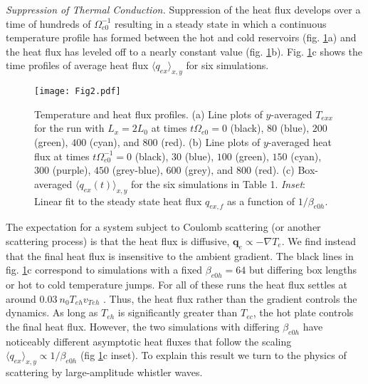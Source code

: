 \documentclass[%
 reprint,
superscriptaddress,
 amsmath,amssymb,
 aps,
]{revtex4-1}
\begin{document}
\textit{Suppression of Thermal Conduction.}  Suppression of the heat flux
develops over a time of hundreds of $\Omega_{e0}^{-1}$ resulting in a
steady state in which a continuous temperature profile has formed
between the hot and cold reservoirs (fig. \ref{fig:2}a) and the heat
flux has leveled off to a nearly constant value
(fig. \ref{fig:2}b). Fig. \ref{fig:2}c shows the time profiles of
average heat flux $\langle q_{ex} \rangle_{x,y}$ for six simulations.
\begin{figure}
    \centering
    \texttt{[image: Fig2.pdf]}
    \caption{Temperature and heat flux profiles. (a) Line plots of $y$-averaged $T_{exx}$ for the run with $L_{x}=2L_{0}$ at times $t\Omega_{e0}=0$ (black), $80$ (blue), $200$ (green), $400$ (cyan), and $800$ (red). (b) Line plots of $y$-averaged heat flux at times $t\Omega_{e0}^{-1}=0$ (black), $30$ (blue), $100$ (green), $150$ (cyan), $300$ (purple), $450$ (grey-blue), $600$ (grey), and $800$ (red). (c) Box-averaged $\langle q_{ex}(t) \rangle_{x,y}$ for the six simulations in Table 1. \textit{Inset}: Linear fit to the steady state heat flux $q_{ex,f}$ as a function of $1/\beta_{e0h}$. }
    \label{fig:2}
\end{figure}
The expectation for a system subject to Coulomb scattering
(or another scattering process) is that the heat flux is diffusive,
$\mathbf{q}_{e} \propto - \nabla{T_{e}}$. We find instead that the final heat
flux is insensitive to the ambient gradient. The black lines in fig. \ref{fig:2}c correspond to simulations
with a fixed $\beta_{e0h}=64$ but differing box lengths or hot to cold
temperature jumps. For all of these runs the heat flux settles at
around $0.03 \: n_{0}T_{eh}v_{Teh}$ . Thus, the heat flux rather than the gradient controls the dynamics. As long as $T_{eh}$ is significantly greater than $T_{ec}$, the
hot plate controls the final heat flux. However, the two simulations with differing $\beta_{e0h}$ have noticeably different asymptotic heat fluxes that follow
the scaling $\langle q_{ex} \rangle_{x,y} \propto 1/\beta_{e0h}$ (fig \ref{fig:2}c inset).  To explain this result we turn to the physics of scattering by
large-amplitude whistler waves.
\end{document}
